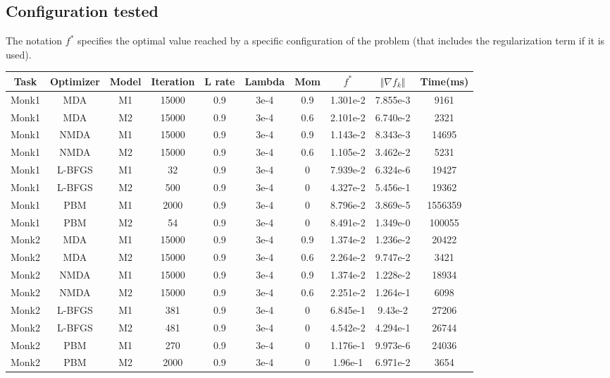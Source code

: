 \subsection{Configuration tested}
The notation $f^*$ specifies the optimal value reached by a specific configuration of the problem (that includes the regularization term if it is used). 

\begin{center}
	\small\addtolength{\tabcolsep}{-3pt}
		\centering
		\begin{longtable}{|c|c|c|c|c|c|c|c|c|c|}
			\hline
			\textbf{Task}& \textbf{Optimizer}&\textbf{Model}&\textbf{Iteration} & \textbf{L rate} & \multicolumn{1}{l|}{\textbf{Lambda}} & \textbf{Mom} & \textbf{$f^{*}$}& \textbf{$\Vert \nabla f_{k}\Vert$ }& \textbf{Time(ms)}\\ \hline 
			Monk1 & MDA & M1 & 15000 & 0.9 & 3e-4  & 0.9 & 1.301e-2  & 7.855e-3 & 9161 \\
			Monk1 & MDA & M2 & 15000 & 0.9 & 3e-4  & 0.6 & 2.101e-2 & 6.740e-2 &  2321\\
			Monk1 & NMDA & M1 & 15000 & 0.9 & 3e-4  & 0.9 & 1.143e-2 & 8.343e-3 & 14695 \\
			Monk1 & NMDA & M2 & 15000 & 0.9 & 3e-4  & 0.6 & 1.105e-2 & 3.462e-2 & 5231 \\
			Monk1 & L-BFGS & M1 & 32 & 0.9 & 3e-4  & 0 &  7.939e-2 & 6.324e-6 & 19427  \\
			Monk1 & L-BFGS & M2 & 500 & 0.9 & 3e-4  & 0 &   4.327e-2 & 5.456e-1 & 19362 \\
			Monk1 & PBM & M1 & 2000 & 0.9 & 3e-4  & 0 & 8.796e-2  & 3.869e-5 & 1556359 \\
			Monk1 & PBM & M2 & 54 & 0.9 & 3e-4  & 0 & 8.491e-2 & 1.349e-0 & 100055 \\
			
			Monk2 & MDA & M1 & 15000 & 0.9 & 3e-4  & 0.9 & 1.374e-2 & 1.236e-2 & 20422 \\
			Monk2 & MDA & M2 & 15000 & 0.9 & 3e-4  & 0.6 & 2.264e-2 & 9.747e-2 & 3421 \\
			Monk2 & NMDA & M1 & 15000 & 0.9 & 3e-4  & 0.9 &  1.374e-2 & 1.228e-2 & 18934  \\
			Monk2 & NMDA & M2 & 15000 & 0.9 & 3e-4  & 0.6 & 2.251e-2 & 1.264e-1 & 6098 \\
			Monk2 & L-BFGS & M1 & 381 & 0.9 & 3e-4  & 0 & 6.845e-1 & 9.43e-2 & 27206 \\
			Monk2 & L-BFGS & M2 & 481 & 0.9 & 3e-4  & 0 & 4.542e-2 & 4.294e-1 & 26744 \\
			Monk2 & PBM & M1 & 270 & 0.9 & 3e-4  & 0 & 1.176e-1  & 9.973e-6 & 24036 \\
			Monk2 & PBM & M2 & 2000 & 0.9 & 3e-4  & 0 & 1.96e-1  & 6.971e-2 & 3654 \\
			

\end{longtable}
\end{center}
